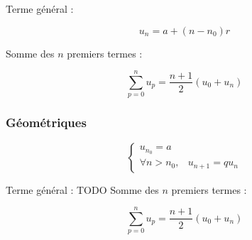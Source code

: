 \documentclass[a4paper,fontsize=7.5pt]{scrreprt}
\begin{document}
\begin{landscape}
\begin{multicols}{3}
Terme général : 

$$u_n = a + (n-n_0)r$$

Somme des $n$ premiers termes : 

$$\sum_{p = 0}^n u_p = \frac{n+1}{2}(u_0 + u_n)$$

\subsubsection{Géométriques}

$$\begin{cases}
        u_{n_0} = a &\\
        \forall n > n_0, & u_{n+1} = qu_n
\end{cases}$$

Terme général : 
TODO
Somme des $n$ premiers termes : 

$$\sum_{p = 0}^n u_p = \frac{n+1}{2}(u_0 + u_n)$$
\end{multicols}
\end{landscape}
\end{document}
